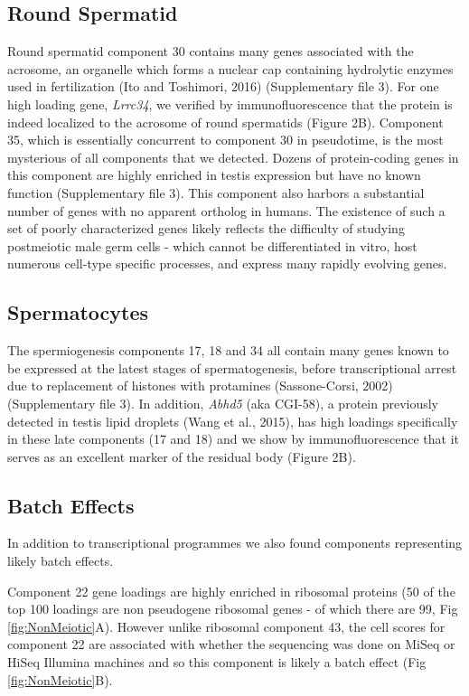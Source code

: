 \subsection{Round Spermatid}
Round spermatid component 30 contains many genes associated with the acrosome, an organelle which forms a nuclear cap containing hydrolytic enzymes used in fertilization (Ito and Toshimori, 2016) (Supplementary file 3). For one high loading gene, \textit{Lrrc34}, we verified by immunofluorescence that the protein is indeed localized to the acrosome of round spermatids (Figure 2B). Component 35, which is essentially concurrent to component 30 in pseudotime, is the most mysterious of all components that we detected. Dozens of protein-coding genes in this component are highly enriched in testis expression but have no known function (Supplementary file 3). This component also harbors a substantial number of genes with no apparent ortholog in humans. The existence of such a set of poorly characterized genes likely reflects the difficulty of studying postmeiotic male germ cells - which cannot be differentiated in vitro, host numerous cell-type specific processes, and express many rapidly evolving genes.

\subsection{Spermatocytes}

The spermiogenesis components 17, 18 and 34 all contain many genes known to be expressed at the latest stages of spermatogenesis, before transcriptional arrest due to replacement of histones with protamines (Sassone-Corsi, 2002) (Supplementary file 3). In addition, \textit{Abhd5} (aka CGI-58), a protein previously detected in testis lipid droplets (Wang et al., 2015), has high loadings specifically in these late components (17 and 18) and we show by immunofluorescence that it serves as an excellent marker of the residual body (Figure 2B).

\subsection{Batch Effects}

In addition to transcriptional programmes we also found components representing likely batch effects. 

Component 22 gene loadings are highly enriched in ribosomal proteins (50 of the top 100 loadings are non pseudogene ribosomal genes - of which there are 99, Fig \ref{fig:NonMeiotic}A). However unlike ribosomal component 43, the cell scores for component 22 are associated with whether the sequencing was done on MiSeq or HiSeq Illumina machines and so this component is likely a batch effect (Fig \ref{fig:NonMeiotic}B).

